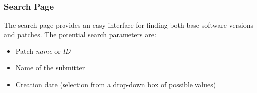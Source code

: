 \begin{center}
\end{center}

\subsubsection{Search Page}
The search page provides an easy interface for finding both base software 
versions and patches.  The potential search parameters are:

\begin{itemize}
\item Patch \emph{name} or \emph{ID}
\item Name of the submitter
\item Creation date (selection from a drop-down box of possible values)
\end{itemize}

\begin{center}
\end{center}

